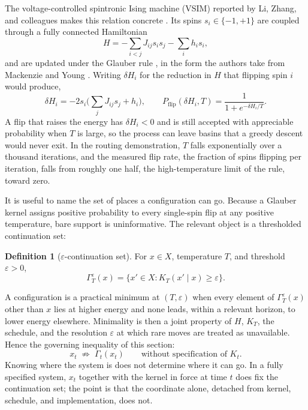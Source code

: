 \documentclass[11pt]{article}
\theoremstyle{definition}
\newtheorem{definition}{Definition}
\theoremstyle{remark}
\begin{document}
The voltage-controlled spintronic Ising machine (VSIM) reported by Li, Zhang, and colleagues makes this relation concrete \cite{li2026}. Its spins $s_i \in \{-1, +1\}$ are coupled through a fully connected Hamiltonian
\begin{equation}
H = -\sum_{i<j} J_{ij} s_i s_j - \sum_i h_i s_i ,
\end{equation}
and are updated under the Glauber rule \cite{glauber1963}, in the form the authors take from Mackenzie and Young \cite{mackenzie1983}. Writing $\delta H_i$ for the reduction in $H$ that flipping spin $i$ would produce,
\begin{equation}
\delta H_i = -2 s_i \Big( \sum_j J_{ij} s_j + h_i \Big), \qquad
P_{\mathrm{flip}}(\delta H_i, T) = \frac{1}{1 + e^{-\delta H_i / T}} .
\end{equation}
A flip that raises the energy has $\delta H_i < 0$ and is still accepted with appreciable probability when $T$ is large, so the process can leave basins that a greedy descent would never exit. In the routing demonstration, $T$ falls exponentially over a thousand iterations, and the measured flip rate, the fraction of spins flipping per iteration, falls from roughly one half, the high-temperature limit of the rule, toward zero.

It is useful to name the set of places a configuration can go. Because a Glauber kernel assigns positive probability to every single-spin flip at any positive temperature, bare support is uninformative. The relevant object is a thresholded continuation set:
\begin{definition}[$\varepsilon$-continuation set]
For $x \in X$, temperature $T$, and threshold $\varepsilon > 0$,
\begin{equation}
\Gamma_T^{\varepsilon}(x) = \{ x' \in X : K_T(x' \mid x) \geq \varepsilon \}.
\end{equation}
\end{definition}
A configuration is a practical minimum at $(T,\varepsilon)$ when every element of $\Gamma_T^{\varepsilon}(x)$ other than $x$ lies at higher energy and none leads, within a relevant horizon, to lower energy elsewhere. Minimality is then a joint property of $H$, $K_T$, the schedule, and the resolution $\varepsilon$ at which rare moves are treated as unavailable. Hence the governing inequality of this section:
\begin{equation}
x_t \;\not\Rightarrow\; \Gamma_t(x_t) \qquad \text{without specification of } K_t .
\end{equation}
Knowing where the system is does not determine where it can go. In a fully specified system, $x_t$ together with the kernel in force at time $t$ does fix the continuation set; the point is that the coordinate alone, detached from kernel, schedule, and implementation, does not.
\end{document}
